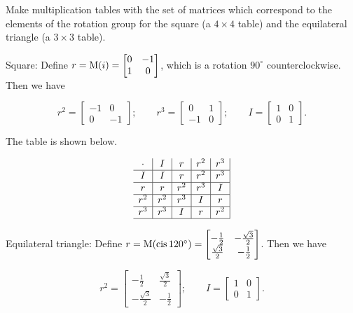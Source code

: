 \documentclass[../key.tex]{subfiles}
\begin{document}
\begin{outer_problem}
\item Make multiplication tables with the set of matrices which correspond to the elements of the rotation group for the square (a $4\times 4$ table) and the equilateral triangle (a $3\times 3$ table).
\end{outer_problem}

Square: Define $r=\operatorname{M}(i) = \begin{bmatrix} 0 & -1 \\ 1 & 0 \end{bmatrix}$, which is a rotation $90^\circ$ counterclockwise. Then we have

$$r^2 = \begin{bmatrix} -1 & 0 \\ 0 & -1 \end{bmatrix};\qquad r^3 = \begin{bmatrix} 0 & 1 \\ -1 & 0 \end{bmatrix};\qquad I = \begin{bmatrix} 1 & 0 \\ 0 & 1 \end{bmatrix}.$$

The table is shown below.

$$\begin{array}{c|c|c|c|c|}
\cdot & I & r & r^2 & r^3 \\ \hline
I & I & r & r^2 & r^3 \\ \hline
r & r & r^2 & r^3 & I \\ \hline
r^2 & r^2 & r^3 & I & r \\ \hline
r^3 & r^3 & I & r & r^2 \\ \hline
\end{array}$$

Equilateral triangle: Define $r=\operatorname{M}(\operatorname{cis} 120^\circ)=\begin{bmatrix} -\frac{1}{2} & -\frac{\sqrt{3}}{2} \\ \frac{\sqrt{3}}{2} & -\frac{1}{2}\end{bmatrix}$. Then we have

$$r^2 = \begin{bmatrix} -\frac{1}{2} & \frac{\sqrt{3}}{2} \\ -\frac{\sqrt{3}}{2} & -\frac{1}{2}\end{bmatrix};\qquad I = \begin{bmatrix} 1 & 0 \\ 0 & 1 \end{bmatrix}.$$
\end{document}
